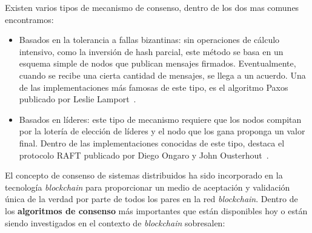 Existen varios tipos de mecanismo de consenso, dentro de los dos mas comunes encontramos:
\begin{itemize}
\item Basados en la tolerancia a fallas bizantinas: sin operaciones de cálculo intensivo, como la inversión de hash parcial, este método se basa en un esquema simple de nodos que publican mensajes firmados. Eventualmente, cuando se recibe una cierta cantidad de mensajes, se llega a un acuerdo. Una de las implementaciones más famosas de este tipo, es  el  algoritmo Paxos publicado por Leslie Lamport~\cite{lamport2001paxos}.

\item Basados en líderes: este tipo de mecanismo requiere que los nodos compitan por la lotería de elección de líderes y el nodo que los gana proponga un valor final. Dentro de las implementaciones conocidas de este tipo, destaca el protocolo RAFT publicado por Diego Ongaro y John Ousterhout~\cite{ongaro2015raft}.
\end{itemize}

El concepto de consenso de sistemas distribuidos ha sido incorporado  en la tecnología \textit{blockchain} para proporcionar un medio de aceptación y validación única de la verdad por parte de todos los pares en la red \textit{blockchain}. Dentro de los \textbf{algoritmos de consenso} más importantes que están disponibles hoy o están siendo investigados en el contexto de \textit{blockchain} sobresalen:

